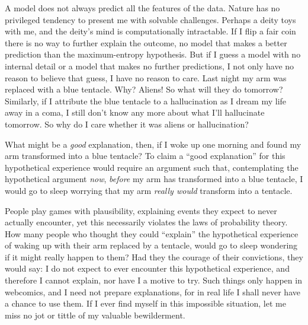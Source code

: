 {
 A model does not always predict all the features of the data.
Nature has no privileged tendency to present me with solvable
challenges. Perhaps a deity toys with me, and the
deity's mind is computationally intractable. If I flip
a fair coin there is no way to further explain the outcome, no model
that makes a better prediction than the maximum-entropy hypothesis. But
if I guess a model with no internal detail or a model that makes no
further predictions, I not only have no reason to believe that guess, I
have no reason to care. Last night my arm was replaced with a blue
tentacle. Why? Aliens! So what will they do tomorrow? Similarly, if I
attribute the blue tentacle to a hallucination as I dream my life away
in a coma, I still don't know any more about what
I'll hallucinate tomorrow. So why do I care whether it
was aliens or hallucination?}

{
 What might be a \textit{good} explanation, then, if I woke up one
morning and found my arm transformed into a blue tentacle? To claim a
``good explanation'' for this
hypothetical experience would require an argument such that,
contemplating the hypothetical argument \textit{now}, \textit{before}
my arm has transformed into a blue tentacle, I would go to sleep
worrying that my arm \textit{really would} transform into a tentacle.}

{
 People play games with plausibility, explaining events they expect
to never actually encounter, yet this necessarily violates the laws of
probability theory. How many people who thought they could
``explain'' the hypothetical
experience of waking up with their arm replaced by a tentacle, would go
to sleep wondering if it might really happen to them? Had they the
courage of their convictions, they would say: I do not expect to ever
encounter this hypothetical experience, and therefore I cannot explain,
nor have I a motive to try. Such things only happen in webcomics, and I
need not prepare explanations, for in real life I shall never have a
chance to use them. If I ever find myself in this impossible situation,
let me miss no jot or tittle of my valuable bewilderment.}

